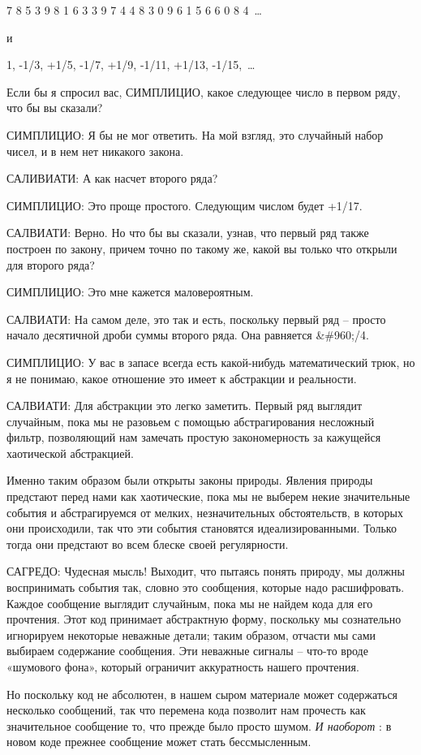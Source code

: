 \documentclass[../main.tex]{subfiles}
\begin{document}
7 8 5 3 9 8 1 6 3 3 9 7 4 4 8 3 0 9 6 1 5 6 6 0 8 4~\ldots{}

и

1, -1/3, +1/5, -1/7, +1/9, -1/11, +1/13, -1/15,~\ldots{}

Если бы я спросил вас, СИМПЛИЦИО, какое следующее число в первом ряду, что бы вы сказали?

СИМПЛИЦИО: Я бы не мог ответить. На мой взгляд, это случайный набор чисел, и в нем нет никакого закона.

САЛИВИАТИ: А как насчет второго ряда?

СИМПЛИЦИО: Это проще простого. Следующим числом будет +1/17.

САЛВИАТИ: Верно. Но что бы вы сказали, узнав, что первый ряд также построен по закону, причем точно по такому же, какой вы только что открыли для второго ряда?

СИМПЛИЦИО: Это мне кажется маловероятным.

САЛВИАТИ: На самом деле, это так и есть, поскольку первый ряд \--- просто начало десятичной дроби суммы второго ряда. Она равняется \&\#960;/4.

СИМПЛИЦИО: У вас в запасе всегда есть какой-нибудь математический трюк, но я не понимаю, какое отношение это имеет к абстракции и реальности.

САЛВИАТИ: Для абстракции это легко заметить. Первый ряд выглядит случайным, пока мы не разовьем с помощью абстрагирования несложный фильтр, позволяющий нам замечать простую закономерность за кажущейся хаотической абстракцией.

Именно таким образом были открыты законы природы. Явления природы предстают перед нами как хаотические, пока мы не выберем некие значительные события и абстрагируемся от мелких, незначительных обстоятельств, в которых они происходили, так что эти события становятся идеализированными. Только тогда они предстают во всем блеске своей регулярности.

САГРЕДО: Чудесная мысль! Выходит, что пытаясь понять природу, мы должны воспринимать события так, словно это сообщения, которые надо расшифровать. Каждое сообщение выглядит случайным, пока мы не найдем кода для его прочтения. Этот код принимает абстрактную форму, поскольку мы сознательно игнорируем некоторые неважные детали; таким образом, отчасти мы сами выбираем содержание сообщения. Эти неважные сигналы \--- что-то вроде «шумового фона», который ограничит аккуратность нашего прочтения.

Но поскольку код не абсолютен, в нашем сыром материале может содержаться несколько сообщений, так что перемена кода позволит нам прочесть как значительное сообщение то, что прежде было просто шумом. \emph{И наоборот} : в новом коде прежнее сообщение может стать бессмысленным.
\end{document}
